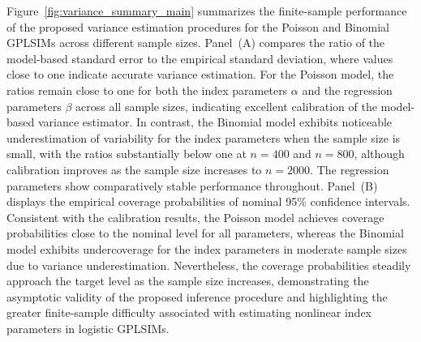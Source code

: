 Figure~\ref{fig:variance_summary_main} summarizes the finite-sample performance of the proposed variance estimation procedures for the Poisson and Binomial GPLSIMs across different sample sizes. Panel~(A) compares the ratio of the model-based standard error to the empirical standard deviation, where values close to one indicate accurate variance estimation. For the Poisson model, the ratios remain close to one for both the index parameters $\alpha$ and the regression parameters $\beta$ across all sample sizes, indicating excellent calibration of the model-based variance estimator. In contrast, the Binomial model exhibits noticeable underestimation of variability for the index parameters when the sample size is small, with the ratios substantially below one at $n=400$ and $n=800$, although calibration improves as the sample size increases to $n=2000$. The regression parameters show comparatively stable performance throughout. Panel~(B) displays the empirical coverage probabilities of nominal 95\% confidence intervals. Consistent with the calibration results, the Poisson model achieves coverage probabilities close to the nominal level for all parameters, whereas the Binomial model exhibits undercoverage for the index parameters in moderate sample sizes due to variance underestimation. Nevertheless, the coverage probabilities steadily approach the target level as the sample size increases, demonstrating the asymptotic validity of the proposed inference procedure and highlighting the greater finite-sample difficulty associated with estimating nonlinear index parameters in logistic GPLSIMs.

